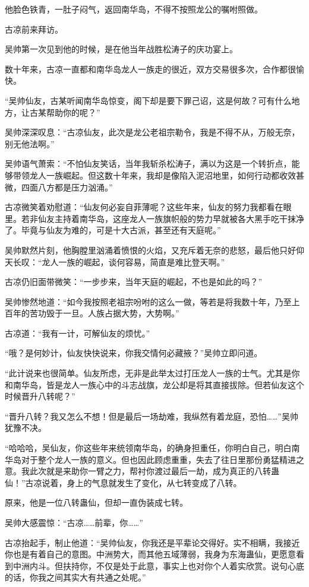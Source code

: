 \begin{this_body}
他脸色铁青，一肚子闷气，返回南华岛，不得不按照龙公的嘱咐照做。

古凉前来拜访。

吴帅第一次见到他的时候，是在他当年战胜松涛子的庆功宴上。

数十年来，古凉一直都和南华岛龙人一族走的很近，双方交易很多次，合作都很愉快。

“吴帅仙友，古某听闻南华岛惊变，阁下却是要下罪己诏，这是何故？可有什么地方，让古某帮助你的呢？”

吴帅深深叹息：“古凉仙友，此次是龙公老祖宗勒令，我是不得不从，万般无奈，别无他法啊。”

吴帅语气萧索：“不怕仙友笑话，当年我斩杀松涛子，满以为这是一个转折点，能够带领龙人一族崛起。但这数十年来，我却是像陷入泥沼地里，如何行动都收效甚微，四面八方都是压力汹涌。”

古凉微笑着劝慰道：“仙友何必妄自菲薄呢？这些年来，仙友的努力我都看在眼里。若非仙友主持着南华岛，这座龙人一族旗帜般的势力早就被各大黑手吃干抹净了。毕竟与仙友为难的，可是十大古派，甚至还有天庭呢。”

吴帅默然片刻，他胸膛里汹涌着愤恨的火焰，又充斥着无奈的悲怒，最后他只好仰天长叹：“龙人一族的崛起，谈何容易，简直是难比登天啊。”

古凉仍旧面带微笑：“一步步来，当年天庭的崛起，不也是如此的吗？”

吴帅惨然地道：“如今我按照老祖宗吩咐的这么一做，等若是将我数十年，乃至上百年的苦功毁于一旦。人族占据大势，大势啊。”

古凉道：“我有一计，可解仙友的烦忧。”

“哦？是何妙计，仙友快快说来，你我交情何必藏掖？”吴帅立即问道。

“此计说来也很简单。仙友所虑，无非是此举太过打压龙人一族的士气。尤其是你和南华岛，皆是龙人一族心中的斗志战旗，龙公却是将其直接拔除。但若仙友这个时候晋升八转呢？”

“晋升八转？我又怎么不想！但是最后一场劫难，我纵然有着龙庭，恐怕……”吴帅犹豫不决。

“哈哈哈，吴仙友，你这些年来统领南华岛，的确身担重任，你明白自己，明白南华岛对于整个龙人一族的意义。但也因此顾虑重重，失去了往日里那份勇猛精进之意。我此次就是来助你一臂之力，帮衬你渡过最后一劫，成为真正的八转蛊仙！”古凉说着，身上的气息就发生了变化，从七转变成了八转。

原来，他是一位八转蛊仙，但却一直伪装成七转。

吴帅大感震惊：“古凉……前辈，你……”

古凉抬起手，制止他道：“吴帅仙友，你我还是平辈论交得好。实不相瞒，我接近你也是有着自己的意图。中洲势大，而其他五域薄弱，我身为东海蛊仙，更愿意看到中洲内斗。但扶持你，不仅是处于此意，事实上也对你个人着实欣赏。说句心底的话，你我之间其实大有共通之处呢。”


\end{this_body}
